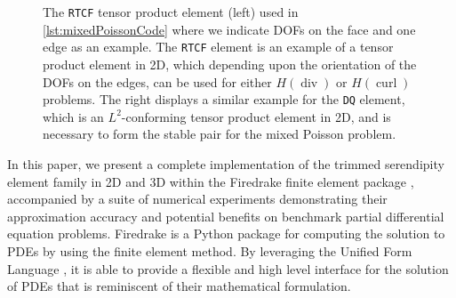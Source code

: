 \documentclass[format=acmsmall,screen,timestamp=false,a4paper]{acmart}
\DeclareMathOperator{\Div}{div}
\DeclareMathOperator{\curl}{curl}
\newcommand{\hcurl}{\ensuremath{{H}(\curl)}\xspace}
\newcommand{\hdiv}{\ensuremath{{H}(\Div)}\xspace}
\begin{document}
\begin{figure}[htbp]
\caption{The \texttt{RTCF} tensor product element \cite{raviart1977mixed} (left) used in \cref{lst:mixedPoissonCode} where we indicate DOFs on the face and one edge as an example.  The \texttt{RTCF} element is an example of a tensor product element in 2D, which depending upon the orientation of the DOFs on the edges, can be used for either \hdiv or \hcurl problems.  The right displays a similar example for the \texttt{DQ} element, which is an $L^2$-conforming tensor product element in 2D, and is necessary to form the stable pair for the mixed Poisson problem.\label{fig:RTCF}}
\end{figure}
  
In this paper, we present a complete implementation of the trimmed serendipity element family in 2D and 3D within the Firedrake finite element package \cite{rathgeber2016firedrake}, accompanied by a suite of numerical experiments demonstrating their approximation accuracy and potential benefits on benchmark partial differential equation problems.
Firedrake is a Python package for computing the solution to PDEs by using the finite element method.  By leveraging the Unified Form Language \cite{Logg:2012,alnaes2014unified}, it is able to provide a flexible and high level interface for the solution of PDEs that is reminiscent of their mathematical formulation.
\end{document}
